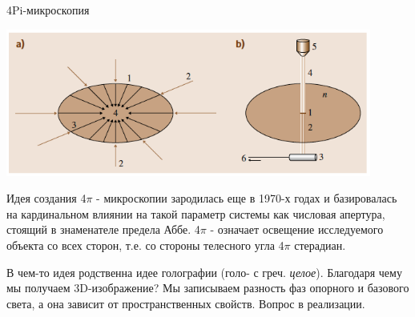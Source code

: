 \documentclass[9pt, compress, xcolor=table]{beamer}
\begin{document}
\begin{frame}{4Pi-микроскопия}
\begin{center}
\includegraphics[width=0.9\textwidth]{ffm01}

Идея создания 4$\pi$ - микроскопии зародилась еще в 1970-х годах и базировалась на кардинальном влиянии на такой параметр системы как числовая апертура, стоящий в знаменателе предела Аббе. 4$\pi$ - означает освещение исследуемого объекта со всех сторон, т.е. со стороны телесного угла 4$\pi$ стерадиан.  

В чем-то идея родственна идее голографии (голо- с греч. \textit{целое}). Благодаря чему мы получаем 3D-изображение? Мы записываем разность фаз опорного и базового света, а она зависит от пространственных свойств. Вопрос в реализации.
\end{center}
\end{frame}
\end{document}
